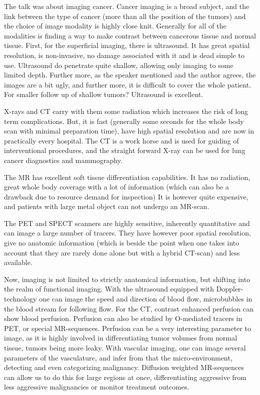 \documentclass[12p]{article}
\begin{document}
The talk was about imaging cancer.
Cancer imaging is a broad subject, and the link between the type of cancer (more than all the position of the tumors) and the choice of image modality is highly close knit.
Generally for all of the modalities is finding a way to make contrast between cancerous tissue and normal tissue.
First, for the superficial imaging, there is ultrasound.
It has great spatial resolution, is non-invasive, no damage associated with it and is dead simple to use.
Ultrasound do penetrate quite shallow, allowing only imaging to some limited depth.
Further more, as the speaker mentioned and the author agrees, the images are a bit ugly, and further more, it is difficult to cover the whole patient.
For smaller follow up of shallow tumors? Ultrasound is excellent.

X-rays and CT carry with them some radiation which increases the risk of long term complications.
But, it is fast (generally some seconds for the whole body scan with minimal preparation time), have high spatial resolution and are now in practically every hospital.
The CT is a work horse and is used for guiding of interventional procedures, and the straight forward X-ray can be used for lung cancer diagnostics and mammography.

The MR has excellent soft tissue differentiation capabilities.
It has no radiation, great whole body coverage with a lot of information (which can also be a drawback due to resource demand for inspection)
It is however quite expensive, and patients with large metal object can not undergo an MR-scan.

The PET and SPECT scanners are highly sensitive, inherently quantitative and can image a large number of tracers.
They have however poor spatial resolution, give no anatomic information (which is beside the point when one takes into account that they are rarely done alone but with a hybrid CT-scan) and less available.

Now, imaging is not limited to strictly anatomical information, but shifting into the realm of functional imaging.
With the ultrasound equipped with Doppler-technology one can image the speed and direction of blood flow, microbubbles in the blood stream for following flow.
For the CT, contrast enhanced perfusion can show blood perfusion.
Perfusion can also be studied by O-mediated tracers in PET, or special MR-sequences.
Perfusion can be a very interesting parameter to image, as it is highly involved in differentiating tumor volumes from normal tissue, tumors being more leaky.
With vascular imaging, one can image several parameters of the vasculature, and infer from that the micro-environment, detecting and even categorizing malignancy.
Diffusion weighted MR-sequences can allow us to do this for large regions at once, differentiating aggressive from less aggressive malignancies or monitor treatment outcomes.
\end{document}
